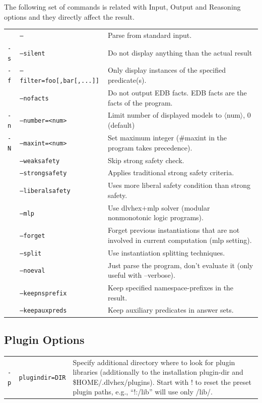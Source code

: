 \documentclass[14pt,a4paper, titlepage]{article}
\begin{document}
\bigskip
The following set of commands is related with Input, Output and  Reasoning options and they directly affect the result.
\renewcommand{\arraystretch}{2}
\begin{center}
\begin{tabular}{  p{1cm}  p{4.7cm} p{6.1cm}  } 
 & \texttt{--} & Parse from standard input. \\ 
\texttt{-s} & \texttt{--silent}& Do not display anything than the actual result \\ 
\texttt{-f} & \texttt{--filter=foo[,bar[,...]]} & Only display instances of the specified predicate(s). \\
& \texttt{--nofacts} & Do not output EDB facts. EDB facts are the facts of the program.  \\
\texttt{-n} & \texttt{--number=<num>} & Limit number of displayed models to $\langle$num$\rangle$, 0 (default)\\ 
\texttt{-N} & \texttt{--maxint=<num>} & Set maximum integer (\#maxint in the program takes precedence). \\
 & \texttt{--weaksafety} & Skip strong safety check.\\
 & \texttt{--strongsafety} & Applies traditional strong safety criteria. \\
  & \texttt{--liberalsafety} & Uses more liberal safety condition than strong safety. \\
  &\texttt{--mlp}& Use dlvhex$+$mlp solver (modular nonmonotonic logic programs).\\
  & \texttt{--forget} & Forget previous instantiations that are not involved in current computation (mlp setting). \\
  & \texttt{--split} &Use instantiation splitting techniques.\\
  & \texttt{--noeval} & Just parse the program, don't evaluate it (only useful with --verbose). \\
  & \texttt{--keepnsprefix} & Keep specified namespace-prefixes in the result. \\
  & \texttt{--keepauxpreds} & Keep auxiliary predicates in answer sets. \\
\end{tabular}
\end{center}
\bigskip
\subsection{Plugin Options}
\begin{center}
\begin{tabular}{  p{1cm}  p{4.7cm} p{6.1cm}  } 
 \texttt{-p}&\texttt{plugindir=DIR}&Specify additional directory where to look for plugin libraries (additionally to the installation plugin-dir and \$HOME/.dlvhex/plugins). Start with ! to reset the preset plugin paths, e.g., ``!:/lib'' will use only /lib/.
 \\
\end{tabular}
\end{center}
\end{document}
